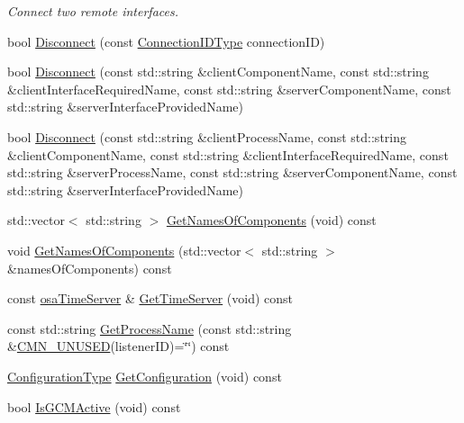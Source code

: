 \begin{DoxyCompactItemize}
\begin{DoxyCompactList}\small\item\em Connect two remote interfaces. \end{DoxyCompactList}\item 
bool \hyperlink{classmts_manager_local_a1c9d984c15b9f2f2e895db18cca18ece}{Disconnect} (const \hyperlink{mts_forward_declarations_8h_ad3543bb11742e1766374ec96016d6547}{Connection\-I\-D\-Type} connection\-I\-D)
\item 
bool \hyperlink{classmts_manager_local_a2895172c0982e44924222883608a8355}{Disconnect} (const std\-::string \&client\-Component\-Name, const std\-::string \&client\-Interface\-Required\-Name, const std\-::string \&server\-Component\-Name, const std\-::string \&server\-Interface\-Provided\-Name)
\item 
bool \hyperlink{classmts_manager_local_abe60ef9db8f2df43b7339fe45ac9de3c}{Disconnect} (const std\-::string \&client\-Process\-Name, const std\-::string \&client\-Component\-Name, const std\-::string \&client\-Interface\-Required\-Name, const std\-::string \&server\-Process\-Name, const std\-::string \&server\-Component\-Name, const std\-::string \&server\-Interface\-Provided\-Name)
\item 
std\-::vector$<$ std\-::string $>$ \hyperlink{classmts_manager_local_a0afcbf7ef6ce076a51cc9a34e8c2dd65}{Get\-Names\-Of\-Components} (void) const 
\item 
void \hyperlink{classmts_manager_local_a7b01b7bd0672bca97fb77350091ec56e}{Get\-Names\-Of\-Components} (std\-::vector$<$ std\-::string $>$ \&names\-Of\-Components) const 
\item 
const \hyperlink{classosa_time_server}{osa\-Time\-Server} \& \hyperlink{classmts_manager_local_ad45868b4726c291d104a7ac4e8848ada}{Get\-Time\-Server} (void) const 
\item 
const std\-::string \hyperlink{classmts_manager_local_a9ab62a582d5d349ce0b774f446267b8c}{Get\-Process\-Name} (const std\-::string \&\hyperlink{cmn_portability_8h_a021894e2626935fa2305434b1e893ff6}{C\-M\-N\-\_\-\-U\-N\-U\-S\-E\-D}(listener\-I\-D)=\char`\"{}\char`\"{}) const 
\item 
\hyperlink{classmts_manager_local_ade8a34bedd1d420d29c591711913046a}{Configuration\-Type} \hyperlink{classmts_manager_local_a9a0ed82c62c5bd653fef66f44e0c3493}{Get\-Configuration} (void) const 
\item 
bool \hyperlink{classmts_manager_local_aa56c7d6e7d559a4af44ed06e2a4a9f02}{Is\-G\-C\-M\-Active} (void) const 
\item 

\end{DoxyCompactItemize}
